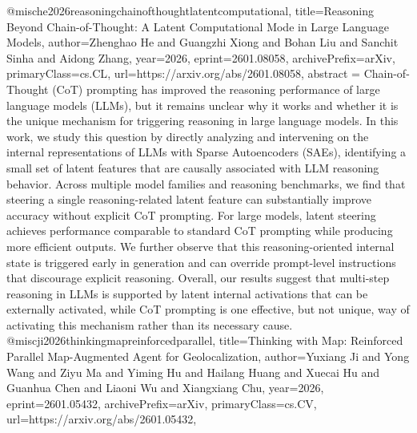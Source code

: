 {}@misc{he2026reasoningchainofthoughtlatentcomputational,
      title={Reasoning Beyond Chain-of-Thought: A Latent Computational Mode in Large Language Models}, 
      author={Zhenghao He and Guangzhi Xiong and Bohan Liu and Sanchit Sinha and Aidong Zhang},
      year={2026},
      eprint={2601.08058},
      archivePrefix={arXiv},
      primaryClass={cs.CL},
      url={https://arxiv.org/abs/2601.08058},
      abstract = {Chain-of-Thought (CoT) prompting has improved the reasoning performance of large language models (LLMs), but it remains unclear why it works and whether it is the unique mechanism for triggering reasoning in large language models. In this work, we study this question by directly analyzing and intervening on the internal representations of LLMs with Sparse Autoencoders (SAEs), identifying a small set of latent features that are causally associated with LLM reasoning behavior. Across multiple model families and reasoning benchmarks, we find that steering a single reasoning-related latent feature can substantially improve accuracy without explicit CoT prompting. For large models, latent steering achieves performance comparable to standard CoT prompting while producing more efficient outputs. We further observe that this reasoning-oriented internal state is triggered early in generation and can override prompt-level instructions that discourage explicit reasoning. Overall, our results suggest that multi-step reasoning in LLMs is supported by latent internal activations that can be externally activated, while CoT prompting is one effective, but not unique, way of activating this mechanism rather than its necessary cause.}
}@misc{ji2026thinkingmapreinforcedparallel,
      title={Thinking with Map: Reinforced Parallel Map-Augmented Agent for Geolocalization}, 
      author={Yuxiang Ji and Yong Wang and Ziyu Ma and Yiming Hu and Hailang Huang and Xuecai Hu and Guanhua Chen and Liaoni Wu and Xiangxiang Chu},
      year={2026},
      eprint={2601.05432},
      archivePrefix={arXiv},
      primaryClass={cs.CV},
      url={https://arxiv.org/abs/2601.05432},
}
